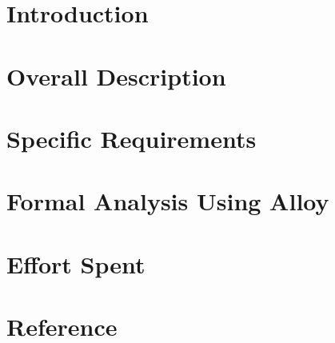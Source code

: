 \clearpage
{\section{Introduction}}
\label{sect:introduction}


\clearpage
{\section{Overall Description}}
\label{sect:overview}


\clearpage
{\section{Specific Requirements}}
\label{sect:requirements}


\clearpage
{\section{Formal Analysis Using Alloy}}
\label{sect:alloy}


\clearpage
{\section{Effort Spent}}
\label{sect:effort}

\clearpage
{\section{Reference}}
\label{sect:reference}



